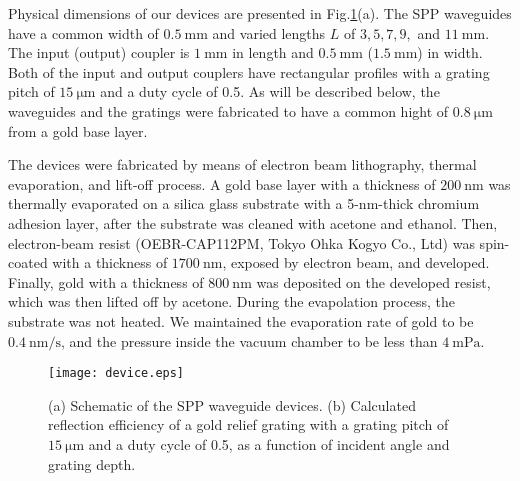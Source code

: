 \documentclass[aip,apl,reprint]{revtex4-1}
\begin{document}
Physical dimensions of \color{red}our devices \color{black}are presented in Fig.\ref{fig:device}(a).  The SPP waveguides have a common width of $0.5\:\mathrm{mm}$ and varied lengths $L$ of $3, 5, 7, 9,$ and $11\:\mathrm{mm}$. The input (output) coupler is $1\:\mathrm{mm}$ in length and $0.5\:\mathrm{mm}$ ($1.5\:\mathrm{mm}$) in width. Both of the input and output couplers have rectangular profiles with a grating pitch of $15\:\mathrm{\mu m}$ and a duty cycle of 0.5. As will be described below, the waveguides and the gratings were fabricated to have a common hight of $0.8\:\mathrm{\mu m}$ from a gold base layer.

The devices were fabricated by means of electron beam lithography, thermal evaporation, and lift-off process. A gold base layer with a thickness of $200\:\mathrm{nm}$ was thermally evaporated on a silica glass substrate with a 5-nm-thick chromium adhesion layer, after the substrate was cleaned with acetone and ethanol. Then, electron-beam resist (OEBR-CAP112PM, Tokyo Ohka Kogyo Co., Ltd) was spin-coated with a thickness of $1700\:\mathrm{nm}$, exposed by electron beam, and developed. Finally, gold with a thickness of $800\:\mathrm{nm}$ was deposited on the developed resist, which was then lifted off by acetone. \color{red}During the evapolation process, the substrate was not heated. We \color{black}maintained the evaporation rate of gold to be $0.4\:\mathrm{nm/s}$, and the pressure inside the vacuum chamber to be less than $4\:\mathrm{mPa}$.

 \begin{figure}
    \texttt{[image: device.eps]}
    \caption{(a) Schematic of the SPP waveguide devices. (b) Calculated reflection efficiency of a gold relief grating with a grating pitch of $15\:\mathrm{\mu m}$ and a duty cycle of 0.5, as a function of incident angle and grating depth.}
     \label{fig:device}
\end{figure}
\end{document}

